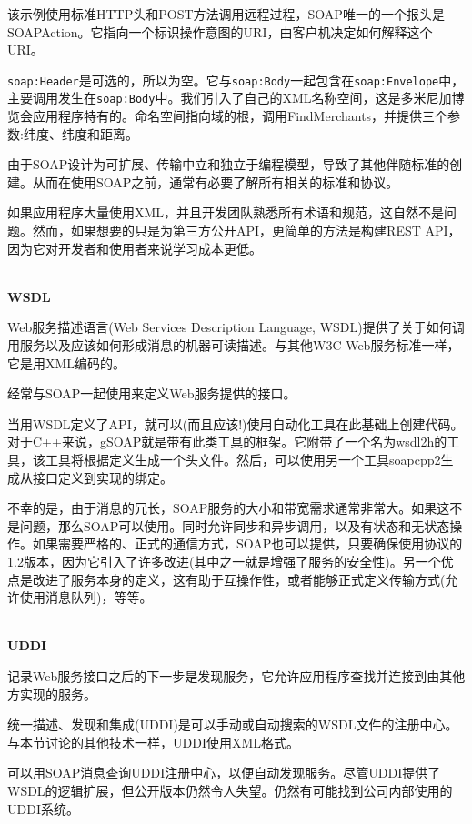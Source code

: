该示例使用标准HTTP头和POST方法调用远程过程，SOAP唯一的一个报头是SOAPAction。它指向一个标识操作意图的URI，由客户机决定如何解释这个URI。

\texttt{soap:Header}是可选的，所以为空。它与\texttt{soap:Body}一起包含在\texttt{soap:Envelope}中，主要调用发生在\texttt{soap:Body}中。我们引入了自己的XML名称空间，这是多米尼加博览会应用程序特有的。命名空间指向域的根，调用FindMerchants，并提供三个参数:纬度、纬度和距离。

由于SOAP设计为可扩展、传输中立和独立于编程模型，导致了其他伴随标准的创建。从而在使用SOAP之前，通常有必要了解所有相关的标准和协议。

如果应用程序大量使用XML，并且开发团队熟悉所有术语和规范，这自然不是问题。然而，如果想要的只是为第三方公开API，更简单的方法是构建REST API，因为它对开发者和使用者来说学习成本更低。

\hspace*{\fill} \\ %
\noindent
\textbf{WSDL}

Web服务描述语言(Web Services Description Language, WSDL)提供了关于如何调用服务以及应该如何形成消息的机器可读描述。与其他W3C Web服务标准一样，它是用XML编码的。

经常与SOAP一起使用来定义Web服务提供的接口。

当用WSDL定义了API，就可以(而且应该!)使用自动化工具在此基础上创建代码。对于C++来说，gSOAP就是带有此类工具的框架。它附带了一个名为wsdl2h的工具，该工具将根据定义生成一个头文件。然后，可以使用另一个工具soapcpp2生成从接口定义到实现的绑定。

不幸的是，由于消息的冗长，SOAP服务的大小和带宽需求通常非常大。如果这不是问题，那么SOAP可以使用。同时允许同步和异步调用，以及有状态和无状态操作。如果需要严格的、正式的通信方式，SOAP也可以提供，只要确保使用协议的1.2版本，因为它引入了许多改进(其中之一就是增强了服务的安全性)。另一个优点是改进了服务本身的定义，这有助于互操作性，或者能够正式定义传输方式(允许使用消息队列)，等等。

\hspace*{\fill} \\ %
\noindent
\textbf{UDDI}

记录Web服务接口之后的下一步是发现服务，它允许应用程序查找并连接到由其他方实现的服务。

统一描述、发现和集成(UDDI)是可以手动或自动搜索的WSDL文件的注册中心。与本节讨论的其他技术一样，UDDI使用XML格式。

可以用SOAP消息查询UDDI注册中心，以便自动发现服务。尽管UDDI提供了WSDL的逻辑扩展，但公开版本仍然令人失望。仍然有可能找到公司内部使用的UDDI系统。

